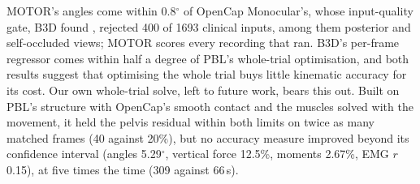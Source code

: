 \documentclass[11pt]{article}
\newcommand{\dg}{\ensuremath{^\circ}}
\begin{document}
MOTOR's angles come within 0.8\dg{} of OpenCap Monocular's, whose input-quality gate, B3D found
\cite{cotton2026b3d}, rejected 400 of 1693 clinical inputs, among them posterior and self-occluded views; MOTOR scores
every recording that ran. B3D's per-frame regressor comes within half a degree of PBL's whole-trial optimisation, and
both results suggest that optimising the whole trial buys little kinematic accuracy for its cost. Our own whole-trial solve, left to future work, bears this out. Built on PBL's structure with OpenCap's smooth contact
\cite{uhlrich2023opencap} and the muscles solved with the movement, it held the pelvis residual within both limits
on twice as many matched frames (40 against 20\%), but no accuracy measure improved beyond its confidence interval
(angles 5.29\dg, vertical force 12.5\%, moments 2.67\%, EMG $r$ 0.15), at five times the time (309 against 66\,s).
\end{document}
